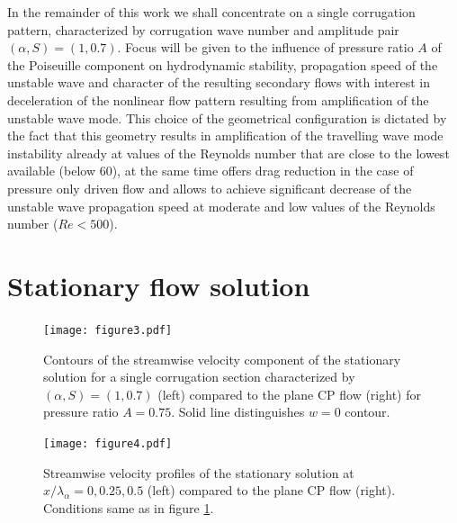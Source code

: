 \documentclass[lineno]{jfm}
\begin{document}
In the remainder of this work we shall concentrate on a single corrugation pattern, characterized by corrugation wave number and amplitude pair $(\alpha, S)=(1,0.7)$.
Focus will be given to the influence of pressure ratio $A$ of the Poiseuille component on hydrodynamic stability, propagation speed of the unstable wave and character of the resulting secondary flows with interest in deceleration of the nonlinear flow pattern resulting from amplification of the unstable wave mode.
This choice of the geometrical configuration is dictated by the fact that this geometry results in amplification of the travelling wave mode instability already at values of the Reynolds number that are close to the lowest available (below $60$), at the same time offers drag reduction in the case of pressure only driven flow \citep{Gepner2020b, Nikesh2017} and allows to achieve significant decrease of the unstable wave propagation speed at moderate and low values of the Reynolds number ($Re<500$).


\section{Stationary flow solution}\label{sec:2dflow}
\begin{figure}
\centering
 \texttt{[image: figure3.pdf]}  
 \caption{Contours of the streamwise velocity component of the stationary solution for a single corrugation section characterized by $(\alpha,S)=(1,0.7)$ (left) compared to the plane CP flow (right) for pressure ratio $A=0.75$. Solid line distinguishes $w=0$ contour.}
 \label{fig:streamwise_vel}
\end{figure}

\begin{figure}
\centering
 \texttt{[image: figure4.pdf]}  
 \caption{Streamwise velocity profiles of the stationary solution at $x/\lambda_\alpha=0, 0.25, 0.5$ (left) compared to the plane CP flow (right). Conditions same as in figure \ref{fig:streamwise_vel}.}
 \label{fig:streamwise_prof}
\end{figure}
\end{document}
